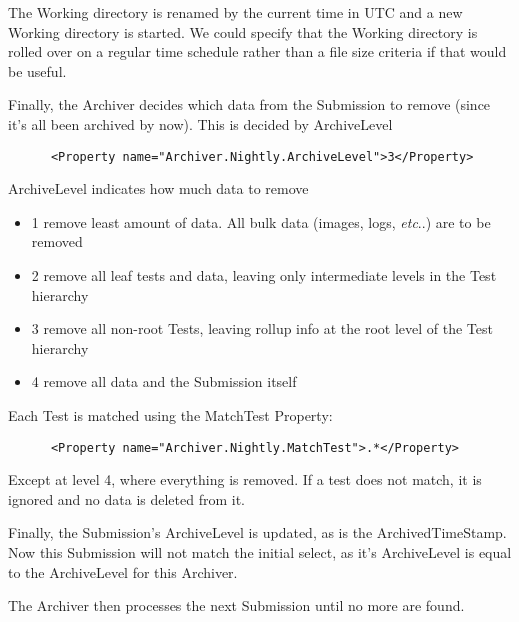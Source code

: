 \documentclass{InsightBook}
\makeatletter
\DeclareRobustCommand\onedot{\futurelet\@let@token\@onedot}
\def\@onedot{\ifx\@let@token.\else.\xspace\fi}
\def\etc{\emph{etc}\onedot}
\makeatother
\begin{document}
The Working directory is renamed by the current time in UTC and a new Working directory is started.  We could specify that the Working directory is rolled over on a regular time schedule rather than a file size criteria if that would be useful.

Finally, the Archiver decides which data from the Submission to remove (since it's all been archived by now).  This is decided by ArchiveLevel
\begin{verbatim}
      <Property name="Archiver.Nightly.ArchiveLevel">3</Property>
\end{verbatim}

 ArchiveLevel indicates how much data to remove
\begin{itemize}
             \item 1 remove least amount of data.  All bulk data (images, logs, \etc) are to be removed
             \item 2 remove all leaf tests and data, leaving only intermediate levels in the Test hierarchy
             \item 3 remove all non-root Tests, leaving rollup info at the root level of the Test hierarchy
             \item 4 remove all data and the Submission itself
\end{itemize}

Each Test is matched using the MatchTest Property:
\begin{verbatim}
      <Property name="Archiver.Nightly.MatchTest">.*</Property>
\end{verbatim}

Except at level 4, where everything is removed.  If a test does not match, it is ignored and no data is deleted from it.

Finally, the Submission's ArchiveLevel is updated, as is the ArchivedTimeStamp.  Now this Submission will not match the initial select, as it's ArchiveLevel is equal to the ArchiveLevel for this Archiver.

The Archiver then processes the next Submission until no more are found.
\end{document}
